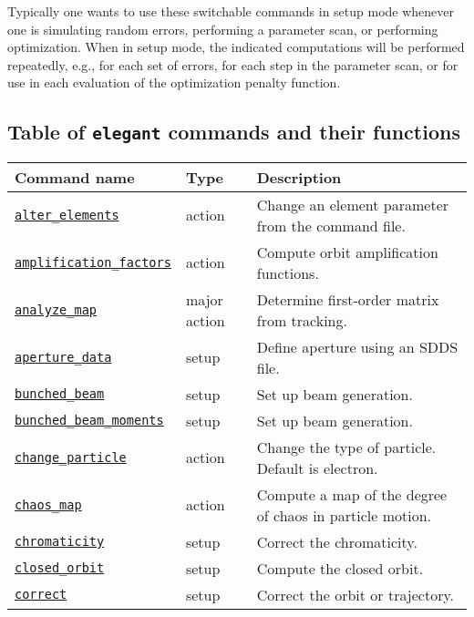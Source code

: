 \documentclass[11pt]{article}
\begin{document}
Typically one wants to use these switchable commands in setup mode whenever one is
simulating random errors, performing a parameter scan, or performing optimization.
When in setup mode, the indicated computations will be performed repeatedly, e.g.,
for each set of errors, for each step in the parameter scan, or for use in each
evaluation of the optimization penalty function.

\newpage
\subsection{Table of {\tt elegant} commands and their functions}

\begin{longtable}{|p{2.75in}|p{0.75in}|p{2.75in}|}
\hline
Command name & Type & Description \\\hline 
\hyperref[subsec:alterelements]{\tt alter\_elements} & action & Change an element parameter from the command file. \\ \hline
\hyperref[subsec:amplificationfactors]{\tt amplification\_factors} & action & Compute orbit amplification functions. \\ \hline
\hyperref[subsec:analyzemap]{\tt analyze\_map} & major action & Determine first-order matrix from tracking. \\ \hline
\hyperref[subsec:aperturedata]{\tt aperture\_data} & setup & Define aperture using an SDDS file. \\ \hline
\hyperref[subsec:bunchedbeam]{\tt bunched\_beam} & setup & Set up beam generation. \\ \hline
\hyperref[subsec:bunchedbeammoments]{\tt bunched\_beam\_moments} & setup & Set up beam generation. \\ \hline
\hyperref[subsec:changeparticle]{\tt change\_particle} & action & Change the type of particle. Default is electron.\\ \hline
\hyperref[subsec:chaosmap]{\tt chaos\_map} & action & Compute a map of the degree of chaos in particle motion.\\ \hline
\hyperref[subsec:chromaticity]{\tt chromaticity} & setup & Correct the chromaticity. \\ \hline
\hyperref[subsec:closedorbit]{\tt closed\_orbit} & setup & Compute the closed orbit. \\ \hline
\hyperref[subsec:correct]{\tt correct} & setup & Correct the orbit or trajectory. \\ \hline

\end{longtable}
\end{document}
